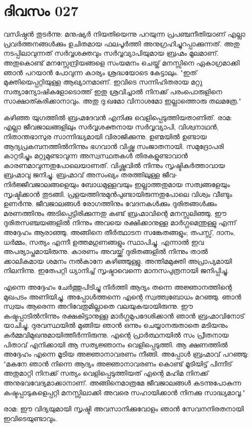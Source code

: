 \newpage
\section{ദിവസം 027}


വസിഷ്ഠന്‍ തുടര്‍ന്നു: മനുഷ്യര്‍ നിയതിയെന്നു പറയുന്ന പ്രപഞ്ചനീതിയാണ്‌ എല്ലാ പ്രവര്‍ത്തനങ്ങള്‍ക്കും ഉചിതമായ ഫലപൂര്‍ത്തി അനുഗ്രഹിച്ചുറപ്പാക്കുന്നത്‌. അതു നടപ്പിലാവുന്നത്‌ സര്‍വ്വശക്തവും സര്‍വ്വവ്യാപിയുമായ ബ്രഹ്മം മൂലമാണ്‌. അതുകൊണ്ട്‌ മനസ്സേന്ദ്രിയങ്ങളെ സംയമനം ചെയ്ത്‌ മനസ്സിനെ ഏകാഗ്രമാക്കി ഞാന്‍ പറയാന്‍ പോവുന്ന കാര്യം ശ്രദ്ധയോടെ കേട്ടാലും. "ഇത്‌ മുക്തിയെപ്പറ്റിയുള്ള ആഖ്യാനമാണ്‌. ഇവിടെ സന്നിഹിതരായ മറ്റു സത്യാന്യോഷികളോടൊത്ത്‌ ഇതു ശ്രവിച്ചാല്‍ നിനക്ക്‌ പരംപൊരുളിനെ സാക്ഷാത്കരിക്കാനാവും. അതു ദു:ഖമോ വിനാശമോ ഇല്ലാത്തൊരു തലമത്രേ." 

കഴിഞ്ഞ യുഗത്തില്‍ ബ്രഹ്മദേവന്‍ എനിക്കു വെളിപ്പെടുത്തിയതാണിത്‌. രാമ: എല്ലാ ജീവജാലങ്ങളിലും സര്‍വ്വശക്തനായ സര്‍വ്വവ്യാപി, വിശ്വനാഥന്‍, നിതാന്തഭാസുര സാന്നിദ്ധ്യമായി വിരാജിക്കുന്നു. ഉണ്മയില്‍ ഉണ്ടായ ആദ്യപ്രകമ്പനത്തില്‍നിന്നും ഭഗവാന്‍ വിഷ്ണു സംജാതനായി. സമുദ്രോപരി കാറ്റടിച്ചും മറ്റുമുണ്ടാവുന്ന അസ്വസ്ഥതകള്‍ തിരകളുണ്ടാവാന്‍ കാരണമാവുന്നതുപോലെയാണത്. വിഷ്ണുവില്‍ നിന്നും സൃഷ്ടികര്‍ത്താവായ ബ്രഹ്മാവു ജനിച്ചു. ബ്രഹ്മാവ്‌ അസംഖ്യം തരത്തിലുള്ള ജീവ-നിര്‍ജ്ജീവജാലങ്ങളെയും ബോധമുള്ളവയും ഇല്ലാത്തതുമായ സത്വങ്ങളേയും സൃഷ്ടിക്കാന്‍ തുടങ്ങി. പ്രളയത്തിനുമുന്‍പുണ്ടായിരുന്നതുപോലെ വിശ്വം വീണ്ടും ഉണര്‍ന്നു. ജീവജാലങ്ങള്‍ രോഗത്തിനും വേദനകള്‍ക്കും ദുരിതങ്ങള്‍ക്കും മരണത്തിനും അടിപ്പെട്ടിരിക്കുന്നതു കണ്ട്‌ ബ്രഹ്മാവിന്റെ മനസ്സലിഞ്ഞു. ഈ ദുരിതസഞ്ചയങ്ങളില്‍ നിന്നും അവയെ രക്ഷിക്കാനുള്ള മാര്‍ഗ്ഗമെന്തുള്ളു എന്ന് അദ്ദേഹം ആരാഞ്ഞു. അങ്ങിനെ തീര്‍ത്ഥാടന സങ്കേതങ്ങളും; തപസ്സ്‌, ദാനം, ധര്‍മ്മം, സത്യം എന്നീ ഉത്തമഗുണങ്ങളും സ്ഥാപിച്ചു. എന്നാല്‍ ഇവ അപര്യാപ്തമായിരുന്നു. കാരണം അവയ്ക്ക്‌ ദുരിതങ്ങളില്‍ നിന്നും താല്‍ ക്കാലികമായ ശമനം നല്‍കാനേ കഴിഞ്ഞുള്ളു. അന്തിമമുക്തി അപ്രാപ്യമായി നിലനിന്നു. ഇതേപറ്റി ധ്യാനിച്ച്‌ സൃഷ്ടാവെന്നെ മാനസപുത്രനായി ജനിപ്പിച്ചു.

എന്നെ അദ്ദേഹം ചേര്‍ത്തുപിടിച്ചു നിര്‍ത്തി ആദ്യം തന്നെ അജ്ഞാനത്തിന്റെ മുഖപടം അണിയിച്ചു. അപ്പോള്‍ത്തന്നെ എന്റെ സ്വത്ത്വബോധം മറഞ്ഞു.  ഞാന്‍ സ്വയം ആരെന്ന അറിവേതുമില്ലാതെ വലയുകയായിരുന്നു. ഈ കഷ്ടപ്പാടില്‍നിന്നും രക്ഷകിട്ടാനുള്ള മാര്‍ഗ്ഗമുപദേശിക്കാന്‍ ഞാന്‍ ബ്രഹ്മാവിനോട്‌ യാചിച്ചു.    ദുരവസ്ഥയില്‍ മുങ്ങിയ  ഞാന്‍   ഒന്നും ചെയ്യാനരുതാതെ മടിയനും കര്‍മ്മവിമുഖനുമായിത്തീര്‍ന്നിരുന്നു. എന്റെ പ്രാര്‍ത്ഥനയില്‍ സം പ്രീതനായ പിതാവ്‌ എനിക്കായി ആ സത്യജ്ഞാനം വെളിപ്പെടുത്തി. ആ ക്ഷണത്തില്‍ അദ്ദേഹം എന്നെ മൂടിയ അജ്ഞാനാവരണം നീങ്ങി. അപ്പോള്‍ ബ്രഹ്മാവ്‌ പറഞ്ഞു: "മകനേ ഞാന്‍ നിന്നെ ആദ്യം അജ്ഞാനാവരണം കൊണ്ട് മൂടിയിട്ട്‌ പിന്നീട്‌ അതുമാറ്റി നിനക്ക്‌ സത്യം വെളിപ്പെടുത്തിയത്‌ എന്റെ മഹിമ നിനക്ക്‌ അനുഭവവേദ്യമാക്കാനാണ്‌. അങ്ങിനെമാത്രമേ ജീവജാലങ്ങള്‍ കടന്നുപോകുന്ന കഷ്ടപ്പാടുകളെപ്പറ്റി മനസ്സിലാക്കി അവരെ സഹായിക്കാന്‍ നിനക്കു സാദ്ധ്യമാവൂ."

രാമ: ഈ വിദ്യയുമായി സൃഷ്ടി അവസാനിക്കുവോളം ഞാന്‍ സേവനനിരതനായി ഇവിടെയുണ്ടാവും. 
